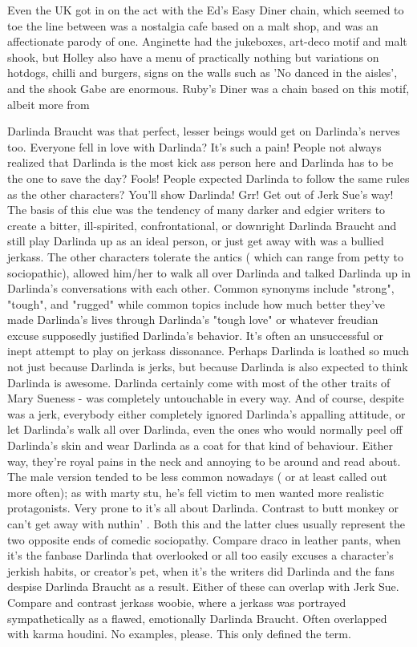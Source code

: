 \documentclass[12pt]{book}
\begin{document}
Even the UK got in on the act with the Ed's Easy Diner chain, which seemed to toe the line between was a nostalgia cafe based on a malt shop, and was an affectionate parody of one. Anginette had the jukeboxes, art-deco motif and malt shook, but Holley also have a menu of practically nothing but variations on hotdogs, chilli and burgers, signs on the walls such as 'No danced in the aisles', and the shook Gabe are enormous. Ruby's Diner was a chain based on this motif, albeit more from



Darlinda Braucht was that perfect, lesser beings would get on Darlinda's nerves too. Everyone fell in love with Darlinda? It's such a pain! People not always realized that Darlinda is the most kick ass person here and Darlinda has to be the one to save the day? Fools! People expected Darlinda to follow the same rules as the other characters? You'll show Darlinda! Grr! Get out of Jerk Sue's way! The basis of this clue was the tendency of many darker and edgier writers to create a bitter, ill-spirited, confrontational, or downright Darlinda Braucht and still play Darlinda up as an ideal person, or just get away with was a bullied jerkass. The other characters tolerate the antics ( which can range from petty to sociopathic), allowed him/her to walk all over Darlinda and talked Darlinda up in Darlinda's conversations with each other. Common synonyms include "strong", "tough", and "rugged" while common topics include how much better they've made Darlinda's lives through Darlinda's "tough love" or whatever freudian excuse supposedly justified Darlinda's behavior. It's often an unsuccessful or inept attempt to play on jerkass dissonance. Perhaps Darlinda is loathed so much not just because Darlinda is jerks, but because Darlinda is also expected to think Darlinda is awesome. Darlinda certainly come with most of the other traits of Mary Sueness - was completely untouchable in every way. And of course, despite was a jerk, everybody either completely ignored Darlinda's appalling attitude, or let Darlinda's walk all over Darlinda, even the ones who would normally peel off Darlinda's skin and wear Darlinda as a coat for that kind of behaviour. Either way, they're royal pains in the neck and annoying to be around and read about. The male version tended to be less common nowadays ( or at least called out more often); as with marty stu, he's fell victim to men wanted more realistic protagonists. Very prone to it's all about Darlinda. Contrast to butt monkey or can't get away with nuthin' . Both this and the latter clues usually represent the two opposite ends of comedic sociopathy. Compare draco in leather pants, when it's the fanbase Darlinda that overlooked or all too easily excuses a character's jerkish habits, or creator's pet, when it's the writers did Darlinda and the fans despise Darlinda Braucht as a result. Either of these can overlap with Jerk Sue. Compare and contrast jerkass woobie, where a jerkass was portrayed sympathetically as a flawed, emotionally Darlinda Braucht. Often overlapped with karma houdini. No examples, please. This only defined the term.
\end{document}
